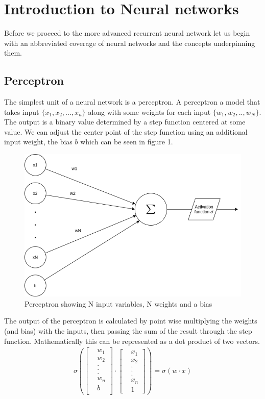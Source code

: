 \documentclass{article}
\begin{document}
\section{Introduction to Neural networks}
\label{sec:intro}
Before we proceed to the more advanced recurrent neural network let us begin with an abbreviated coverage of neural networks and the concepts underpinning them. 
\subsection{Perceptron}
\label{sec:peceptrons}
The simplest unit of a neural network is a perceptron. A perceptron a model that takes input $\{x_1, x_2, ... ,x_n\}$ along with some weights for each input $\{w_1, w_2, .., w_N\}$. The output is a binary value determined by a step function centered at some value. \cite{Nielsen} We can adjust the center point of the step function using an additional input weight, the bias $b$ which can be seen in figure 1.
\begin{figure}[H]
\centering
\caption{Perceptron showing N input variables, N weights and a bias}
\includegraphics[scale=0.5]{peceptron.png}
\end{figure}
The output of the perceptron is calculated by point wise multiplying the weights (and bias) with the inputs, then passing the sum of the result through the step function. Mathematically this can be represented as a dot product of two vectors. 
\begin{align*}
\sigma \left(\begin{bmatrix}
&w_1 \\
&w_2 \\
&. \\
&. \\
&. \\
&w_n \\
&b \\
\end{bmatrix} 
\cdot 
\begin{bmatrix}
&x_1 \\
&x_2 \\
&. \\
&. \\
&. \\
&x_n \\
&1
\end{bmatrix}\right) = \sigma \left(w\cdot x\right)
\end{align*}
\end{document}
